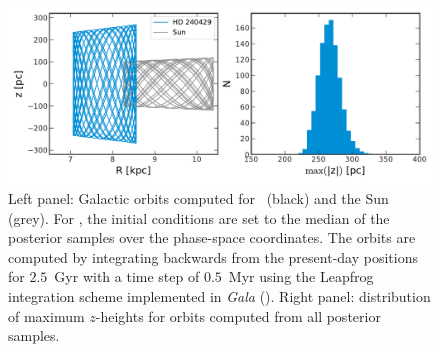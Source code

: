 \documentclass[modern, letterpaper]{aastex61}
\newcommand{\project}[1]{\textsl{#1}}
\newcommand{\sunanalog}{\text{Krios}}
\begin{document}
\begin{figure}[htbp]
  \begin{center}
    \includegraphics[width=\linewidth]{orbits.pdf}
  \end{center}
  \caption{Left panel: Galactic orbits computed for \sunanalog\ (black) and the
    Sun (grey).
    For \sunanalog, the initial conditions are set to the median of the
    posterior samples over the phase-space coordinates.
    The orbits are computed by integrating backwards from the present-day
    positions for $2.5$~Gyr with a time step of $0.5$~Myr using the Leapfrog
    integration scheme implemented in \project{Gala} (\citealt{gala}).
    Right panel: distribution of maximum $z$-heights for orbits computed from
    all posterior samples.
  }
  \label{fig:orbit}
\end{figure}
\end{document}
